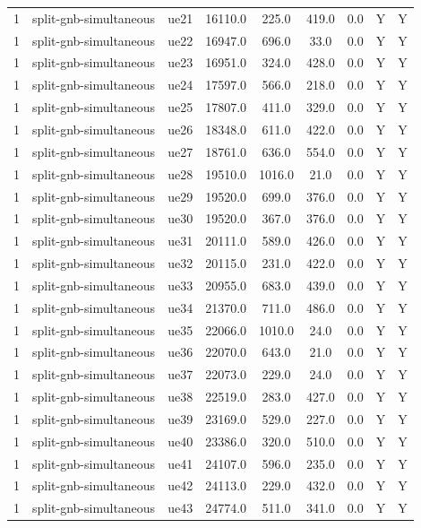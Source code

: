 \begin{table}[ht]
\begin{tabular}{|c|c|c|c|c|c|c|c|c|}
1 & split-gnb-simultaneous & ue21 & 16110.0 & 225.0 & 419.0 & 0.0 & Y & Y \\
1 & split-gnb-simultaneous & ue22 & 16947.0 & 696.0 & 33.0 & 0.0 & Y & Y \\
1 & split-gnb-simultaneous & ue23 & 16951.0 & 324.0 & 428.0 & 0.0 & Y & Y \\
1 & split-gnb-simultaneous & ue24 & 17597.0 & 566.0 & 218.0 & 0.0 & Y & Y \\
1 & split-gnb-simultaneous & ue25 & 17807.0 & 411.0 & 329.0 & 0.0 & Y & Y \\
1 & split-gnb-simultaneous & ue26 & 18348.0 & 611.0 & 422.0 & 0.0 & Y & Y \\
1 & split-gnb-simultaneous & ue27 & 18761.0 & 636.0 & 554.0 & 0.0 & Y & Y \\
1 & split-gnb-simultaneous & ue28 & 19510.0 & 1016.0 & 21.0 & 0.0 & Y & Y \\
1 & split-gnb-simultaneous & ue29 & 19520.0 & 699.0 & 376.0 & 0.0 & Y & Y \\
1 & split-gnb-simultaneous & ue30 & 19520.0 & 367.0 & 376.0 & 0.0 & Y & Y \\
1 & split-gnb-simultaneous & ue31 & 20111.0 & 589.0 & 426.0 & 0.0 & Y & Y \\
1 & split-gnb-simultaneous & ue32 & 20115.0 & 231.0 & 422.0 & 0.0 & Y & Y \\
1 & split-gnb-simultaneous & ue33 & 20955.0 & 683.0 & 439.0 & 0.0 & Y & Y \\
1 & split-gnb-simultaneous & ue34 & 21370.0 & 711.0 & 486.0 & 0.0 & Y & Y \\
1 & split-gnb-simultaneous & ue35 & 22066.0 & 1010.0 & 24.0 & 0.0 & Y & Y \\
1 & split-gnb-simultaneous & ue36 & 22070.0 & 643.0 & 21.0 & 0.0 & Y & Y \\
1 & split-gnb-simultaneous & ue37 & 22073.0 & 229.0 & 24.0 & 0.0 & Y & Y \\
1 & split-gnb-simultaneous & ue38 & 22519.0 & 283.0 & 427.0 & 0.0 & Y & Y \\
1 & split-gnb-simultaneous & ue39 & 23169.0 & 529.0 & 227.0 & 0.0 & Y & Y \\
1 & split-gnb-simultaneous & ue40 & 23386.0 & 320.0 & 510.0 & 0.0 & Y & Y \\
1 & split-gnb-simultaneous & ue41 & 24107.0 & 596.0 & 235.0 & 0.0 & Y & Y \\
1 & split-gnb-simultaneous & ue42 & 24113.0 & 229.0 & 432.0 & 0.0 & Y & Y \\
1 & split-gnb-simultaneous & ue43 & 24774.0 & 511.0 & 341.0 & 0.0 & Y & Y \\

\end{tabular}
\end{table}
